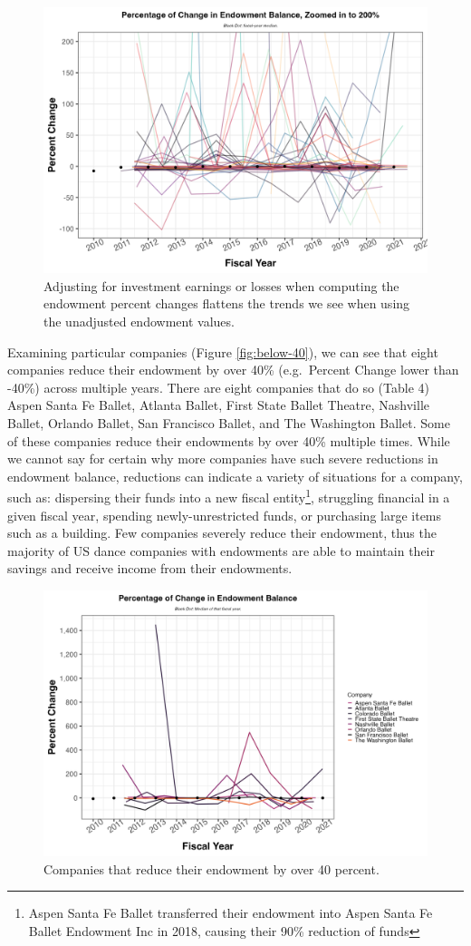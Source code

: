 \documentclass[Dance Data
Project,article,submit,moreauthors,pdftex]{mdpi}
\begin{document}
\begin{figure}[H]
\includegraphics[width=0.8\linewidth,]{../images/pc_endow_flat} \caption{\label{fig:flat} Adjusting for investment earnings or losses when computing the endowment percent changes flattens the trends we see when using the unadjusted endowment values.}\label{fig:flat}
\end{figure}

Examining particular companies (Figure \ref{fig:below-40}), we can see
that eight companies reduce their endowment by over 40\% (e.g.~Percent
Change lower than -40\%) across multiple years. There are eight
companies that do so (Table 4) Aspen Santa Fe Ballet, Atlanta Ballet,
First State Ballet Theatre, Nashville Ballet, Orlando Ballet, San
Francisco Ballet, and The Washington Ballet. Some of these companies
reduce their endowments by over 40\% multiple times. While we cannot say
for certain why more companies have such severe reductions in endowment
balance, reductions can indicate a variety of situations for a company,
such as: dispersing their funds into a new fiscal entity\footnote{Aspen
  Santa Fe Ballet transferred their endowment into Aspen Santa Fe Ballet
  Endowment Inc in 2018, causing their 90\% reduction of funds},
struggling financial in a given fiscal year, spending newly-unrestricted
funds, or purchasing large items such as a building. Few companies
severely reduce their endowment, thus the majority of US dance companies
with endowments are able to maintain their savings and receive income
from their endowments.

\begin{figure}[H]
\includegraphics[width=0.8\linewidth,]{../images/pc_below_40} \caption{\label{fig:below-40} Companies that reduce their endowment by over 40 percent.}\label{fig:unnamed-chunk-8}
\end{figure}
\end{document}
